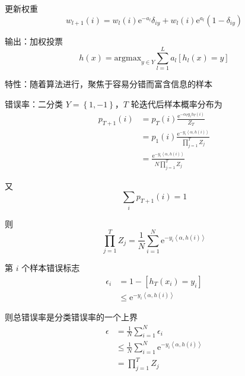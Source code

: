 \documentclass[openany]{ctexbook}
\theoremstyle{kaiti}
\theoremstyle{normal}
\begin{document}
更新权重
\begin{equation}
w_{l+1}(i)=w_l(i)\mathrm{e}^{-a_l}\delta_{iy}+w_l(i)\mathrm{e}^{a_l}(1-\delta_{iy})
\end{equation}

输出：加权投票
\begin{equation}
h(x)=\mathrm{argmax}_{y\in Y}\sum_{l=1}^{L}a_l[h_l(x)=y]
\end{equation}

特性：随着算法进行，聚焦于容易分错而富含信息的样本

错误率：二分类 $Y=\left\{ 1,-1 \right\}$，$T$ 轮迭代后样本概率分布为
\begin{equation}
\begin{aligned}
  p_{T+1}(i)
  &=p_T(i)\frac{\mathrm{e}^{-\alpha_Ty_ih_T(i)}}{Z_T}\\
  &=p_1(i)\frac{\mathrm{e}^{-y_i\left< \alpha ,h(i)\right>}}{\displaystyle\prod_{j=1}^{T}Z_j}\\
  &=\frac{\mathrm{e}^{-y_i\left< \alpha ,h(i)\right>}}{N\displaystyle\prod_{j=1}^{T}Z_j}
\end{aligned}
\end{equation}

又
\begin{equation}
\sum_ip_{T+1}(i)=1 
\end{equation}

则
\begin{equation}
\prod_{j=1}^{T}Z_j=\frac{1}{N}\sum_{i=1}^N\mathrm{e}^{-y_i\left< \alpha ,h(i)\right>}
\end{equation}

第 $i$ 个样本错误标志
\begin{equation}
\begin{aligned}
  \epsilon_i
  &=1-\left[h_T\left(x_i \right)=y_i \right] \\
  &\leqslant \mathrm{e}^{-y_i\left< \alpha ,h(i)\right>}
\end{aligned}
\end{equation}

则总错误率是分类错误率的一个上界
\begin{equation}
\begin{aligned}
  \epsilon 
  &=\frac{1}{N}\sum_{i=1}^N\epsilon_i\\
  &\leqslant\frac{1}{N}\sum_{i=1}^N\mathrm{e}^{-y_i\left< \alpha ,h(i)\right>}\\
  &=\prod_{j=1}^{T}Z_j
\end{aligned}
\end{equation}
\end{document}
